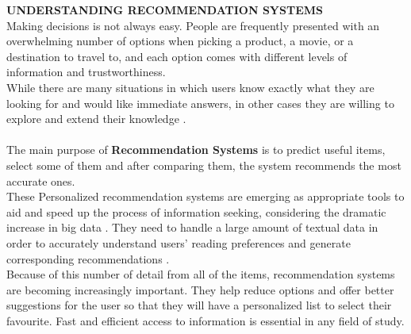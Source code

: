 \documentclass[10pt, oneside,english,hidelinks,a4paper]{article}
\begin{document}
\begin{multicols}{2}
\noindent
\textbf{UNDERSTANDING RECOMMENDATION SYSTEMS}\\
Making decisions is not always easy. People are frequently presented with an overwhelming number of options when picking a product, a movie, or a destination to travel to, and each option comes with different levels of information and trustworthiness. \\
While there are many situations in which users know exactly what they are looking for and would like immediate answers, in other cases they are willing to explore and extend their knowledge \cite{Blanco201333}.\\\\
The main purpose of \textbf{Recommendation Systems} is to predict useful items, select some of them and after comparing them, the system recommends the most accurate ones.\\ 
These Personalized recommendation systems are emerging as appropriate tools to aid and speed up the process of information seeking, considering the dramatic increase in big data \cite{Haruna2017}. They need to handle a large amount of textual data in order to accurately understand users’ reading preferences and generate corresponding recommendations \cite{Yan2024}. \\
%
Because of this number of detail from all of the items, recommendation systems are becoming increasingly important. They help reduce options and offer better suggestions for the user so that they will have a personalized list to select their favourite. Fast and efficient access to information is essential in any field of study. \\\\
%

\end{multicols}
\end{document}
